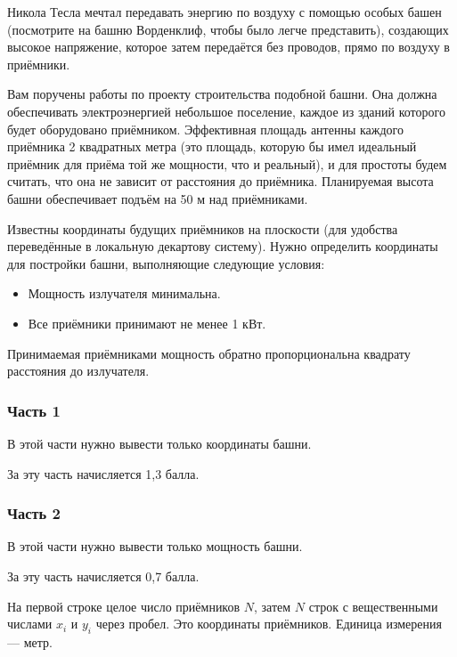 
Никола Тесла мечтал передавать энергию по воздуху с помощью особых башен (посмотрите на башню Ворденклиф, чтобы было легче представить), создающих высокое напряжение, которое затем передаётся без проводов, прямо по воздуху в приёмники.

Вам поручены работы по проекту строительства подобной башни. Она должна обеспечивать электроэнергией небольшое поселение, каждое из зданий которого будет оборудовано приёмником. Эффективная площадь антенны каждого приёмника 2 квадратных метра (это площадь, которую бы имел идеальный приёмник для приёма той же мощности, что и реальный), и для простоты будем считать, что она не зависит от расстояния до приёмника. Планируемая высота башни обеспечивает подъём на 50 м над приёмниками.

Известны координаты будущих приёмников на плоскости (для удобства переведённые в локальную декартову систему). Нужно определить координаты для постройки башни, выполняющие следующие условия: 

\begin{itemize}
    \item Мощность излучателя минимальна.
    \item Все приёмники принимают не менее 1 кВт.
\end{itemize}

Принимаемая приёмниками мощность обратно пропорциональна квадрату расстояния до излучателя.

\subsubsection*{Часть 1}

В этой части нужно вывести только координаты башни.

За эту часть начисляется 1,3 балла.

\subsubsection*{Часть 2}

В этой части нужно вывести только мощность башни.

За эту часть начисляется 0,7 балла.


На первой строке целое число приёмников $N$, затем $N$ строк с вещественными числами 
$x_i$ и $y_i$ через пробел. Это координаты приёмников. Единица измерения — метр.

